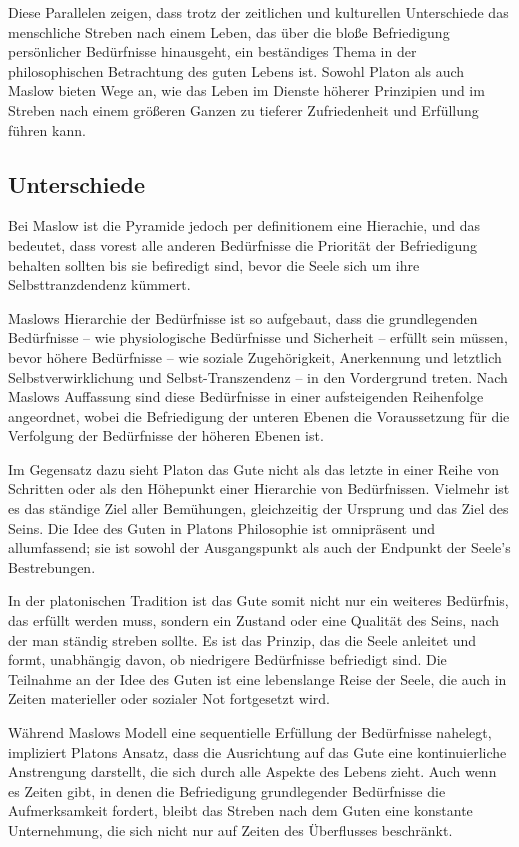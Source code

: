 \documentclass[12pt,a4paper]{article}
\begin{document}
Diese Parallelen zeigen, dass trotz der zeitlichen und kulturellen Unterschiede das menschliche Streben nach einem Leben, das über die bloße Befriedigung persönlicher Bedürfnisse hinausgeht, ein beständiges Thema in der philosophischen Betrachtung des guten Lebens ist. Sowohl Platon als auch Maslow bieten Wege an, wie das Leben im Dienste höherer Prinzipien und im Streben nach einem größeren Ganzen zu tieferer Zufriedenheit und Erfüllung führen kann.

\subsection[short]{Unterschiede}
Bei Maslow ist die Pyramide jedoch per definitionem eine Hierachie, und das bedeutet, dass vorest alle anderen Bedürfnisse die Priorität der Befriedigung behalten sollten bis sie befiredigt sind, bevor die Seele sich um ihre Selbsttranzdendenz kümmert. 

Maslows Hierarchie der Bedürfnisse ist so aufgebaut, dass die grundlegenden Bedürfnisse – wie physiologische Bedürfnisse und Sicherheit – erfüllt sein müssen, bevor höhere Bedürfnisse – wie soziale Zugehörigkeit, Anerkennung und letztlich Selbstverwirklichung und Selbst-Transzendenz – in den Vordergrund treten. Nach Maslows Auffassung sind diese Bedürfnisse in einer aufsteigenden Reihenfolge angeordnet, wobei die Befriedigung der unteren Ebenen die Voraussetzung für die Verfolgung der Bedürfnisse der höheren Ebenen ist.

Im Gegensatz dazu sieht Platon das Gute nicht als das letzte in einer Reihe von Schritten oder als den Höhepunkt einer Hierarchie von Bedürfnissen. Vielmehr ist es das ständige Ziel aller Bemühungen, gleichzeitig der Ursprung und das Ziel des Seins. Die Idee des Guten in Platons Philosophie ist omnipräsent und allumfassend; sie ist sowohl der Ausgangspunkt als auch der Endpunkt der Seele's Bestrebungen.

In der platonischen Tradition ist das Gute somit nicht nur ein weiteres Bedürfnis, das erfüllt werden muss, sondern ein Zustand oder eine Qualität des Seins, nach der man ständig streben sollte. Es ist das Prinzip, das die Seele anleitet und formt, unabhängig davon, ob niedrigere Bedürfnisse befriedigt sind. Die Teilnahme an der Idee des Guten ist eine lebenslange Reise der Seele, die auch in Zeiten materieller oder sozialer Not fortgesetzt wird.

Während Maslows Modell eine sequentielle Erfüllung der Bedürfnisse nahelegt, impliziert Platons Ansatz, dass die Ausrichtung auf das Gute eine kontinuierliche Anstrengung darstellt, die sich durch alle Aspekte des Lebens zieht. Auch wenn es Zeiten gibt, in denen die Befriedigung grundlegender Bedürfnisse die Aufmerksamkeit fordert, bleibt das Streben nach dem Guten eine konstante Unternehmung, die sich nicht nur auf Zeiten des Überflusses beschränkt.
\end{document}
